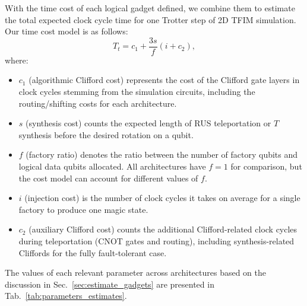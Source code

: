 \documentclass[aps, prx, reprint, superscriptaddress, longbibliography, floatfix]{revtex4-2}
\begin{document}
With the time cost of each logical gadget defined, we combine them to estimate the total expected clock cycle time for one Trotter step of 2D TFIM simulation. Our time cost model is as follows:
\begin{equation}\label{eq:time_cost_model}
    T_t=c_1+\frac{3s}{f}(i+c_2),
\end{equation}
where:
\begin{itemize}
    \item $c_1$ (algorithmic Clifford cost) represents the cost of the Clifford gate layers in clock cycles stemming from the simulation circuits, including the routing/shifting costs for each architecture.
    \item $s$ (synthesis cost) counts the expected length of RUS teleportation or $T$ synthesis before the desired rotation on a qubit.
    \item $f$ (factory ratio) denotes the ratio between the number of factory qubits and logical data qubits allocated. All architectures have $f=1$ for comparison, but the cost model can account for different values of $f$.
    \item $i$ (injection cost) is the number of clock cycles it takes on average for a single factory to produce one magic state.
    \item $c_2$ (auxiliary Clifford cost) counts the additional Clifford-related clock cycles during teleportation (CNOT gates and routing), including synthesis-related Cliffords for the fully fault-tolerant case.
\end{itemize}
The values of each relevant parameter across architectures based on the discussion in Sec.~\ref{sec:estimate_gadgets} are presented in Tab.~\ref{tab:parameters_estimates}.


%


\end{document}
